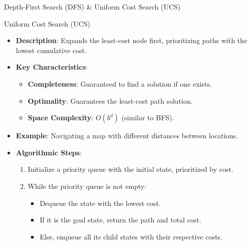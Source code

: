 \documentclass[aspectratio=169]{beamer}
\begin{document}
\begin{frame}[fragile]{Depth-First Search (DFS) \& Uniform Cost Search (UCS)}
    \begin{block}{Uniform Cost Search (UCS)}
        \begin{itemize}
            \item \textbf{Description}: Expands the least-cost node first, prioritizing paths with the lowest cumulative cost.
            \item \textbf{Key Characteristics}:
                \begin{itemize}
                    \item \textbf{Completeness}: Guaranteed to find a solution if one exists.
                    \item \textbf{Optimality}: Guarantees the least-cost path solution.
                    \item \textbf{Space Complexity}: $O(b^d)$ (similar to BFS).
                \end{itemize}
            \item \textbf{Example}: Navigating a map with different distances between locations.
            \item \textbf{Algorithmic Steps}:
                \begin{enumerate}
                    \item Initialize a priority queue with the initial state, prioritized by cost.
                    \item While the priority queue is not empty:
                        \begin{itemize}
                            \item Dequeue the state with the lowest cost.
                            \item If it is the goal state, return the path and total cost.
                            \item Else, enqueue all its child states with their respective costs.
                        \end{itemize}
                \end{enumerate}
        \end{itemize}
    \end{block}
\end{frame}
\end{document}
